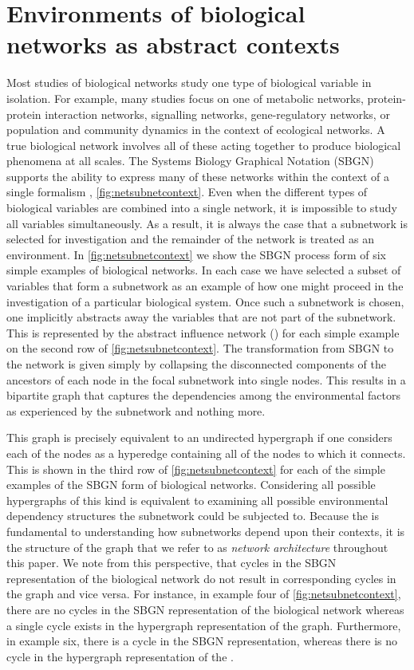 
\section{Environments of biological networks as abstract contexts}\label{sec:networkcontext}
Most studies of biological networks study one type of biological variable in isolation. For example, many studies focus on one of metabolic networks, protein-protein interaction networks, signalling networks, gene-regulatory networks, or population and community dynamics in the context of ecological networks. A true biological network involves all of these acting together to produce biological phenomena at all scales. The Systems Biology Graphical Notation (SBGN) supports the ability to express many of these networks within the context of a single formalism \cite{LeNovere2009}, \ref{fig:netsubnetcontext}. Even when the different types of biological variables are combined into a single network, it is impossible to study all variables simultaneously. As a result, it is always the case that a subnetwork is selected for investigation and the remainder of the network is treated as an environment. In \ref{fig:netsubnetcontext} we show the SBGN process form of six simple examples of biological networks. In each case we have selected a subset of variables that form a subnetwork as an example of how one might proceed in the investigation of a particular biological system. Once such a subnetwork is chosen, one implicitly abstracts away the variables that are not part of the subnetwork. This is represented by the abstract influence network (\AI{}) for each simple example on the second row of \ref{fig:netsubnetcontext}. The transformation from SBGN to the \AI{} network is given simply by collapsing the disconnected components of the ancestors of each node in the focal subnetwork into single \AI{} nodes. This results in a bipartite graph that captures the dependencies among the environmental factors as experienced by the subnetwork and nothing more.

This \AI{} graph is precisely equivalent to an undirected hypergraph if one considers each of the \AI{} nodes as a hyperedge containing all of the nodes to which it connects. This is shown in the third row of \ref{fig:netsubnetcontext} for each of the simple examples of the SBGN form of biological networks. Considering all possible hypergraphs of this kind is equivalent to examining all possible environmental dependency structures the subnetwork could be subjected to. Because the \AI{} is fundamental to understanding how subnetworks depend upon their contexts, it is the structure of the \AI{} graph that we refer to as \emph{network architecture} throughout this paper. We note from this perspective, that cycles in the SBGN representation of the biological network do not result in corresponding cycles in the \AI{} graph and vice versa. For instance, in example four of \ref{fig:netsubnetcontext}, there are no cycles in the SBGN representation of the biological network whereas a single cycle exists in the hypergraph representation of the \AI{} graph. Furthermore, in example six, there is a cycle in the SBGN representation, whereas there is no cycle in the hypergraph representation of the \AI{}.

